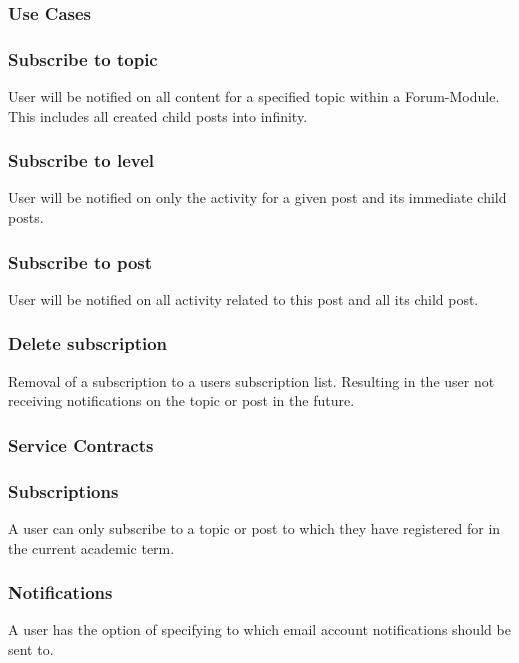\documentclass[12pt]{article}
\begin{document}
\subsubsection{Use Cases}
\subsubsection*{Subscribe to topic}
\par{User will be notified on all content for a specified topic within a Forum-Module. This includes all created child posts into infinity.}
\subsubsection*{Subscribe to level}
\par{User will be notified on only the activity for a given post and its immediate child posts.}
\subsubsection*{Subscribe to post}
\par{User will be notified on all activity related to this post and all its child post.}
\subsubsection*{Delete subscription}
\par{Removal of a subscription to a users subscription list. Resulting in the user not receiving notifications on the topic or post in the future.}

\subsubsection{Service Contracts}
\subsubsection*{Subscriptions}
\par{A user can only subscribe to a topic or post to which they have registered for in the current academic term.}
\subsubsection*{Notifications}
\par{A user has the option of specifying to which email account notifications should be sent to.}

\newpage
\end{document}

